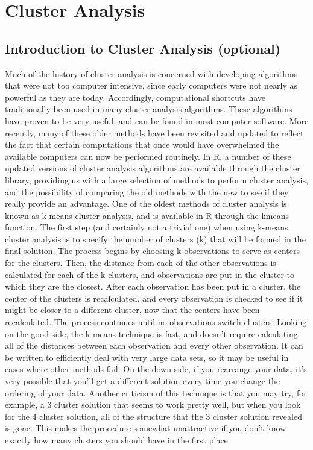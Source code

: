 \tableofcontents

\section{Cluster Analysis}

\subsection{Introduction to Cluster Analysis (optional)}



Much of the history of cluster analysis is concerned with developing algorithms that were not too computer intensive, since early computers were not nearly as powerful as they are today. Accordingly, computational shortcuts have traditionally been used in many cluster analysis algorithms. These algorithms have proven to be very useful, and can be found in most computer software.
More recently, many of these older methods have been revisited and updated to reflect the fact that certain computations that once would have overwhelmed the available computers can now be performed routinely. In R, a number of these updated versions of cluster analysis algorithms are available through the cluster library, providing us with a large selection of methods to perform cluster analysis, and the possibility of comparing the old methods with the new to see if they really provide an advantage.
One of the oldest methods of cluster analysis is known as k-means cluster analysis, and is available in R through the kmeans function. The first step (and certainly not a trivial one) when using k-means cluster analysis is to specify the number of clusters (k) that will be formed in the final solution. The process begins by choosing k observations to serve as centers for the clusters. Then, the distance from each of the other observations is calculated for each of the k clusters, and observations are put in the cluster to which they are the closest. After each observation has been put in a cluster, the center of the clusters is recalculated, and every observation is checked to see if it might be closer to a different cluster, now that the centers have been recalculated. The process continues until no observations switch clusters.
Looking on the good side, the k-means technique is fast, and doesn't require calculating all of the distances between each observation and every other observation. It can be written to efficiently deal with very large data sets, so it may be useful in cases where other methods fail. On the down side, if you rearrange your data, it's very possible that you'll get a different solution every time you change the ordering of your data. Another criticism of this technique is that you may try, for example, a 3 cluster solution that seems to work pretty well, but when you look for the 4 cluster solution, all of the structure that the 3 cluster solution revealed is gone. This makes the procedure somewhat unattractive if you don't know exactly how many clusters you should have in the first place.


